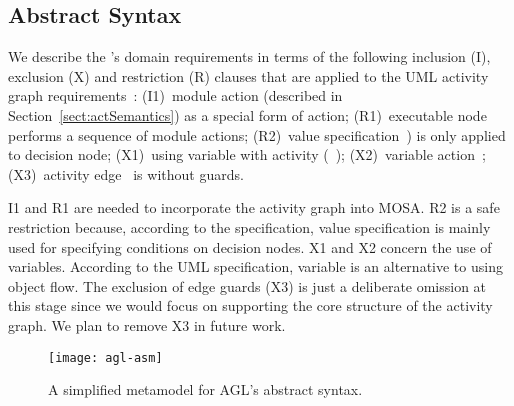 \subsection{Abstract Syntax} 
\label{subsect:agl-abstractSyntax}

We describe the \agl's domain requirements in terms of the following inclusion (I), exclusion (X) and restriction (R) clauses that are applied to the UML activity graph requirements~\cite{omg_unified_2017}: (I1)~module action (described in Section~\ref{sect:actSemantics}) as a special form of action; (R1)~executable node performs a sequence of module actions; (R2)~value specification~\cite[p.~374]{omg_unified_2017}) is only applied to decision node; (X1)~using variable with activity (~\cite[p.~417]{omg_unified_2017}); (X2)~variable action~\cite[p.~467]{omg_unified_2017}; (X3)~activity edge~\cite[p.~373]{omg_unified_2017} is without guards.

I1 and R1 are needed to incorporate the activity graph into MOSA. R2 is a safe restriction because, according to the specification, value specification is mainly used for specifying conditions on decision nodes. X1 and X2 concern the use of variables. According to the UML specification, variable is an alternative to using object flow. The exclusion of edge guards (X3) is just a deliberate omission at this stage since we would focus on supporting the core structure of the activity graph. We plan to remove X3 in future work.
%
%
\begin{figure*}[ht]
	\begin{center}
		\texttt{[image: agl-asm]}
	\end{center}
\vspace{-0.6cm}
	\caption{A simplified metamodel for AGL's abstract syntax.} %
	\label{fig:agl-abstractSyntax}
	\vspace{-0.2cm}
\end{figure*}

